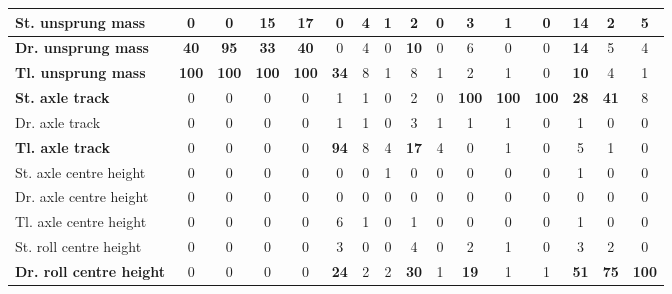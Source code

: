 \begin{table}[H]
\begin{tabular}{|l|c|c|c|c|c|c|c|c|c|c|c|c|c|c|c|}
    \hline
    \textbf{St. unsprung mass} & 0 & 0 & \textbf{15} & \textbf{17} & 0 & 4 & 1 & 2 & 0 & 3 & 1 & 0 & \textbf{14} & 2 & 5 \\
    \hline
    \textcolor[rgb]{0.000, 0.447, 0.698}{\textbf{Dr. unsprung mass}} & \textcolor[rgb]{0.000, 0.620, 0.451}{\textbf{40}} & \textcolor[rgb]{0.000, 0.447, 0.698}{\textbf{95}} & \textcolor[rgb]{0.000, 0.620, 0.451}{\textbf{33}} & \textcolor[rgb]{0.000, 0.620, 0.451}{\textbf{40}} & 0 & 4 & 0 & \textbf{10} & 0 & 6 & 0 & 0 & \textbf{14} & 5 & 4 \\
    \hline
    \textcolor[rgb]{0.851, 0.373, 0.008}{\textbf{Tl. unsprung mass}} & \textcolor[rgb]{0.835, 0.369, 0.000}{\textbf{100}} & \textcolor[rgb]{0.835, 0.369, 0.000}{\textbf{100}} & \textcolor[rgb]{0.835, 0.369, 0.000}{\textbf{100}} & \textcolor[rgb]{0.835, 0.369, 0.000}{\textbf{100}} & \textcolor[rgb]{0.000, 0.620, 0.451}{\textbf{34}} & 8 & 1 & 8 & 1 & 2 & 1 & 0 & \textbf{10} & 4 & 1 \\
    \hline
    \textcolor[rgb]{0.851, 0.373, 0.008}{\textbf{St. axle track}} & 0 & 0 & 0 & 0 & 1 & 1 & 0 & 2 & 0 & \textcolor[rgb]{0.835, 0.369, 0.000}{\textbf{100}} & \textcolor[rgb]{0.835, 0.369, 0.000}{\textbf{100}} & \textcolor[rgb]{0.835, 0.369, 0.000}{\textbf{100}} & \textcolor[rgb]{0.000, 0.620, 0.451}{\textbf{28}} & \textcolor[rgb]{0.000, 0.620, 0.451}{\textbf{41}} & 8 \\
    \hline
    Dr. axle track & 0 & 0 & 0 & 0 & 1 & 1 & 0 & 3 & 1 & 1 & 1 & 0 & 1 & 0 & 0 \\
    \hline
    \textcolor[rgb]{0.000, 0.447, 0.698}{\textbf{Tl. axle track}} & 0 & 0 & 0 & 0 & \textcolor[rgb]{0.000, 0.447, 0.698}{\textbf{94}} & 8 & 4 & \textbf{17} & 4 & 0 & 1 & 0 & 5 & 1 & 0 \\
    \hline
    St. axle centre height & 0 & 0 & 0 & 0 & 0 & 0 & 1 & 0 & 0 & 0 & 0 & 0 & 1 & 0 & 0 \\
    \hline
    Dr. axle centre height & 0 & 0 & 0 & 0 & 0 & 0 & 0 & 0 & 0 & 0 & 0 & 0 & 0 & 0 & 0 \\
    \hline
    Tl. axle centre height & 0 & 0 & 0 & 0 & 6 & 1 & 0 & 1 & 0 & 0 & 0 & 0 & 1 & 0 & 0 \\
    \hline
    St. roll centre height & 0 & 0 & 0 & 0 & 3 & 0 & 0 & 4 & 0 & 2 & 1 & 0 & 3 & 2 & 0 \\
    \hline
    \textcolor[rgb]{0.851, 0.373, 0.008}{\textbf{Dr. roll centre height}} & 0 & 0 & 0 & 0 & \textbf{24} & 2 & 2 & \textcolor[rgb]{0.000, 0.620, 0.451}{\textbf{30}} & 1 & \textbf{19} & 1 & 1 & \textcolor[rgb]{0.000, 0.447, 0.698}{\textbf{51}} & \textcolor[rgb]{0.000, 0.447, 0.698}{\textbf{75}} & \textcolor[rgb]{0.835, 0.369, 0.000}{\textbf{100}} \\

\end{tabular}
\end{table}
